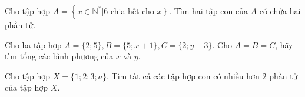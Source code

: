 \begin{bt}%
	Cho tập hợp $A=\left\{x \in \mathbb{N}^* | 6\right.$ chia hết cho $\left.x\right\}$. Tìm hai tập con của $A$ có chứa hai phần tử.
\end{bt}

\begin{bt}%
 Cho ba tập hợp $A=\{2 ; 5\}, B=\{5 ; x+1\}, C=\{2 ; y-3\}$. Cho $A=B=C$, hãy tìm tổng các bình phương của $x$ và $y$.
\end{bt}

\begin{bt}%
	Cho tập hợp $X=\{1;2;3;a\}$. Tìm tất cả các tập hợp con có nhiều hơn $2$ phần tử của tập hợp $X$.
\end{bt}

